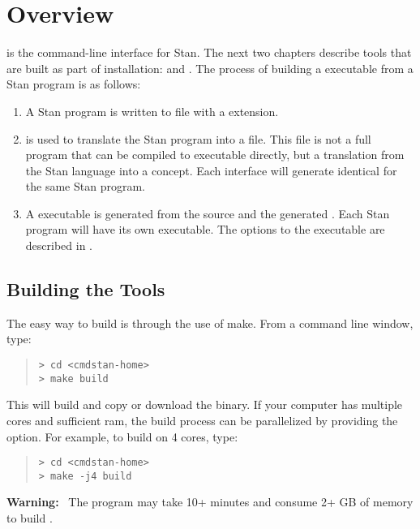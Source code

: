 \chapter{Overview}

\noindent
\CmdStan is the command-line interface for Stan. The next two
chapters describe tools that are built as part of \CmdStan
installation:  and . The process of building a
\CmdStan executable from a Stan program is as follows:
%
\begin{enumerate}
  \item A Stan program is written to file with a 
    extension.
  \item {} is used to translate the Stan program into a
    \Cpp file. This \Cpp file is not a full program that can be
    compiled to executable directly, but a translation from the Stan
    language into a \Cpp concept. Each interface will generate identical
    \Cpp for the same Stan program.
  \item A \CmdStan executable is generated from the \CmdStan source
    and the generated \Cpp. Each Stan program will have its own
    \CmdStan executable. The options to the \CmdStan executable are
    described in .
\end{enumerate}


\section{Building the \CmdStan Tools}\label{build.section}

The easy way to build \CmdStan is through the use of make. From a
command line window, type:
%
\begin{quote}
\begin{Verbatim}[fontshape=sl,fontsize=\small]
> cd <cmdstan-home>
> make build
\end{Verbatim}
\end{quote}
%
This will build  and copy or download the  binary. If your computer
has multiple cores and sufficient ram, the build process can be parallelized
by providing the  option. For example, to build on 4 cores, type:
%
\begin{quote}
\begin{Verbatim}[fontshape=sl,fontsize=\small]
> cd <cmdstan-home>
> make -j4 build
\end{Verbatim}
\end{quote}
%
\textbf{Warning:} \ The  program may take 10+ minutes and
consume 2+ GB of memory to build \CmdStan.
